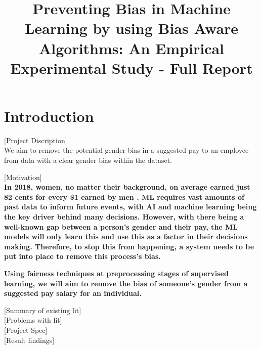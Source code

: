 \documentclass{sigchi}
\def\plaintitle{Preventing Bias in Machine Learning by using Bias Aware Algorithms: An Empirical Experimental Study - Full Report}
\begin{document}
\title{\plaintitle}

\author{%
}

\maketitle

\section{Introduction}

[Project Discription]\\
We aim to remove the potential gender bias in a suggested pay to an employee from data with a clear gender bias within the dataset. 

[Motivation]\\
\textbf{In 2018, women, no matter their background, on average earned just 82 cents for every \$1 earned by men \cite{1}. ML requires vast amounts of past data to inform future events, with AI and machine learning being the key driver behind many decisions. However, with there being a well-known gap between a person's gender and their pay, the ML models will only learn this and use this as a factor in their decisions making. Therefore, to stop this from happening, a system needs to be put into place to remove this process's bias.} 

\textbf{Using fairness techniques at preprocessing stages \cite{3} of supervised learning, we will aim to remove the bias of someone's gender from a suggested pay salary for an individual. } %

[Summary of existing lit]\\


[Problems with lit]\\

[Project Spec]\\ %

[Result findings]\\
\end{document}
